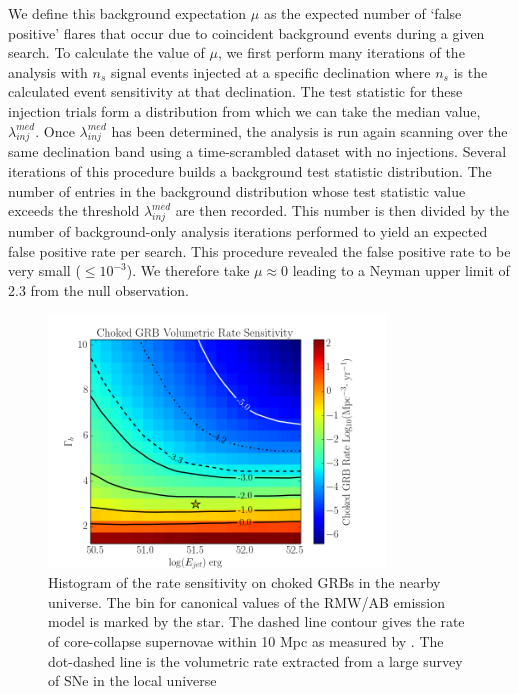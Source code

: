 \documentclass[manuscript]{aastex}
\begin{document}
We define this background expectation $\mu$ as the expected number of `false positive' flares that occur due to coincident background events during a given search. To calculate the value of $\mu$, we first perform many iterations of the analysis with $n_s$ signal events injected at a specific declination where $n_s$ is the calculated event sensitivity at that declination. The test statistic for these injection trials form a distribution from which we can take the median value, $\lambda_{inj}^{med}$. Once $\lambda_{inj}^{med}$ has been determined, the analysis is run again scanning over the same declination band using a time-scrambled dataset with no injections. Several iterations of this procedure builds a background test statistic distribution. The number of entries in the background distribution whose test statistic value exceeds the threshold $\lambda_{inj}^{med}$ are then recorded. This number is then divided by the number of background-only analysis iterations performed to yield an expected false positive rate per search. This procedure revealed the false positive rate to be very small ($\leq 10^{-3}$). We therefore take $\mu\approx0$ leading to a Neyman upper limit of 2.3 from the null observation.
\begin{figure}[ht]
  \begin{center}
    \includegraphics[width=0.8\textwidth,keepaspectratio]{plots/RateSens_2DHisto_wContours_SysAdjusted.png}
  \end{center}
  \caption[Choked GRB Volumetric Rate Sensitivity]{Histogram of the rate sensitivity on choked GRBs in the nearby universe. The bin for canonical values of the RMW/AB emission model is marked by the star. The dashed line contour gives the rate of core-collapse supernovae within 10 Mpc as measured by \cite{2011PhRvD..83l3008K}. The dot-dashed line is the volumetric rate extracted from a large survey of SNe in the local universe \citep{2011MNRAS.412.1419L}}
  \label{fig:VolumetricRateSensitivity}
\end{figure}
\end{document}
